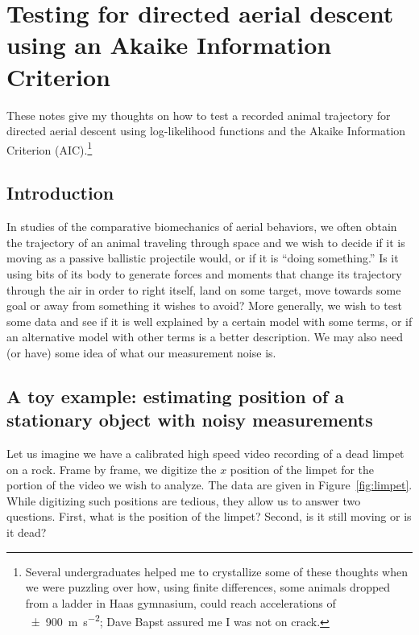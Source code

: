 
\chapter{Testing for directed aerial descent using an Akaike Information Criterion}
\label{app:tdd}

These notes give my thoughts on how to test a recorded animal trajectory for directed aerial descent using log-likelihood functions and the Akaike Information Criterion (AIC).\footnote{Several undergraduates helped me to crystallize some of these thoughts when we were puzzling over how, using finite differences, some animals dropped from a ladder in Haas gymnasium, could reach accelerations of \SI[separate-uncertainty]{+-900}{\meter\per\second\squared}; Dave Bapst assured me I was not on crack.}

\section{Introduction}
In studies of the comparative biomechanics of aerial behaviors, we often obtain the trajectory of an animal traveling through space and we wish to decide if it is moving as a passive ballistic projectile would, or if it is ``doing something.'' Is it using bits of its body to generate forces and moments that change its trajectory through the air in order to right itself, land on some target, move towards some goal or away from something it wishes to avoid?  More generally, we wish to test some data and see if it is well explained by a certain model with some terms, or if an alternative model with other terms is a better description.  We may also need (or have) some idea of what our measurement noise is. 

\section{A toy example: estimating position of a stationary object with noisy measurements}
Let us imagine we have a calibrated high speed video recording of a dead limpet on a rock.  Frame by frame, we digitize the $x$ position of the limpet for the portion of the video we wish to analyze.  The data are given in Figure~\ref{fig:limpet}.  While digitizing such positions are tedious, they allow us to answer two questions.  First, what is the position of the limpet?  Second, is it still moving or is it dead?  

